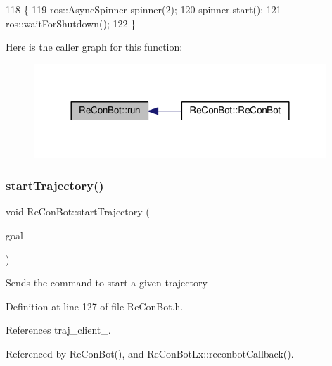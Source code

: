 \begin{DoxyCode}
118                   \{
119     ros::AsyncSpinner spinner(2);
120     spinner.start();
121     ros::waitForShutdown();
122 \}
\end{DoxyCode}
Here is the caller graph for this function\+:
\nopagebreak
\begin{figure}[H]
\begin{center}
\leavevmode
\includegraphics[width=312pt]{d9/d0b/class_re_con_bot_ac264f3082203c3b2ef13b6f353476ca7_icgraph}
\end{center}
\end{figure}
\mbox{\label{class_re_con_bot_ade3eb1a4752d45659321209f5730cef3}} 
\subsubsection{\texorpdfstring{start\+Trajectory()}{startTrajectory()}}
{\footnotesize\ttfamily void Re\+Con\+Bot\+::start\+Trajectory (\begin{DoxyParamCaption}\item[{control\+\_\+msgs\+::\+Follow\+Joint\+Trajectory\+Goal}]{goal }\end{DoxyParamCaption})}

Sends the command to start a given trajectory 

Definition at line 127 of file Re\+Con\+Bot.\+h.



References traj\+\_\+client\+\_\+.



Referenced by Re\+Con\+Bot(), and Re\+Con\+Bot\+Lx\+::reconbot\+Callback().


